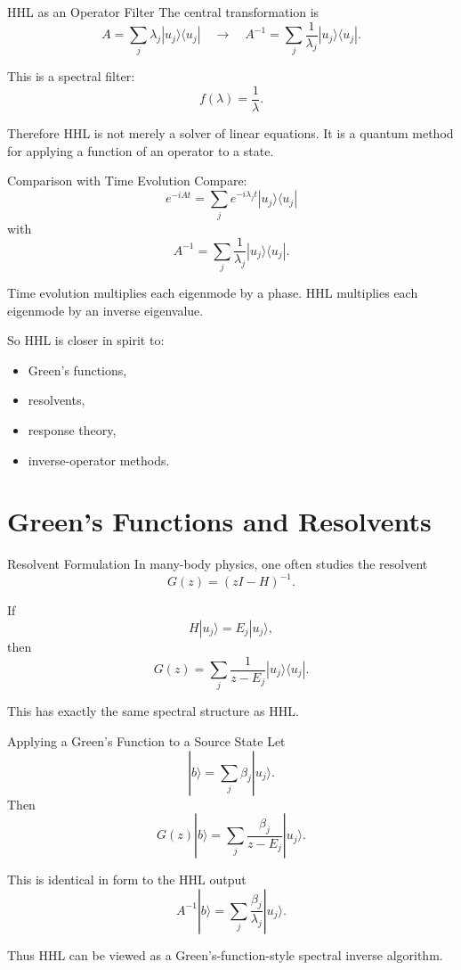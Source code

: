 \documentclass{beamer}
\begin{document}
\begin{frame}{HHL as an Operator Filter}
The central transformation is
\[
A = \sum_j \lambda_j |u_j\rangle\langle u_j|
\quad \longrightarrow \quad
A^{-1} = \sum_j \frac{1}{\lambda_j}|u_j\rangle\langle u_j|.
\]

This is a spectral filter:
\[
f(\lambda) = \frac{1}{\lambda}.
\]

Therefore HHL is not merely a solver of linear equations. It is a quantum method for applying a function of an operator to a state.
\end{frame}


\begin{frame}{Comparison with Time Evolution}
Compare:
\[
e^{-iAt} = \sum_j e^{-i\lambda_j t}|u_j\rangle\langle u_j|
\]
with
\[
A^{-1} = \sum_j \frac{1}{\lambda_j}|u_j\rangle\langle u_j|.
\]

Time evolution multiplies each eigenmode by a phase.
HHL multiplies each eigenmode by an inverse eigenvalue.

So HHL is closer in spirit to:
\begin{itemize}
\item Green's functions,
\item resolvents,
\item response theory,
\item inverse-operator methods.
\end{itemize}
\end{frame}

\section{Green's Functions and Resolvents}

\begin{frame}{Resolvent Formulation}
In many-body physics, one often studies the resolvent
\[
G(z) = (zI - H)^{-1}.
\]

If
\[
H|u_j\rangle = E_j |u_j\rangle,
\]
then
\[
G(z) = \sum_j \frac{1}{z-E_j}|u_j\rangle\langle u_j|.
\]

This has exactly the same spectral structure as HHL.
\end{frame}


\begin{frame}{Applying a Green's Function to a Source State}
Let
\[
|b\rangle = \sum_j \beta_j |u_j\rangle.
\]
Then
\[
G(z)|b\rangle
=
\sum_j \frac{\beta_j}{z-E_j}|u_j\rangle.
\]

This is identical in form to the HHL output
\[
A^{-1}|b\rangle
=
\sum_j \frac{\beta_j}{\lambda_j}|u_j\rangle.
\]

Thus HHL can be viewed as a Green's-function-style spectral inverse algorithm.
\end{frame}
\end{document}
